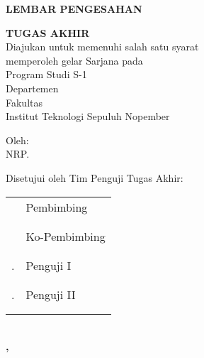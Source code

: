 \begin{center}
  \large
  \textbf{LEMBAR PENGESAHAN}
\end{center}

\thispagestyle{empty}

\begin{center}
  \textbf{\tatitle{}}
\end{center}

\begingroup
\small

\begin{center}
  \textbf{TUGAS AKHIR}
  \\Diajukan untuk memenuhi salah satu syarat \\
  memperoleh gelar Sarjana pada \\
  Program Studi S-1 \studyprogram{} \\
  Departemen \department{} \\
  Fakultas \faculty{} \\
  Institut Teknologi Sepuluh Nopember
\end{center}

\begin{center}
  Oleh: \textbf{\name{}}
  \\NRP. \nrp{}
\end{center}

\begin{center}
  Disetujui oleh Tim Penguji Tugas Akhir:
\end{center}

\begingroup
\setlength{\tabcolsep}{0pt}

\noindent
\begin{tabularx}{\textwidth}{X l}
  \advisor{}               & Pembimbing                        \\
                           &                                     \\
                           &                                     \\
  \coadvisor{}             & Ko-Pembimbing                     \\
                           &                                     \\
                           &                                     \\
  \examinerone{}.          & Penguji I                         \\
                           &                                     \\
                           &                                     \\
  \examinertwo{}.          & Penguji II                        \\
                           &                                     \\
                           &                                     \\

\end{tabularx}
\endgroup

\begin{center}
  \textbf{\MakeUppercase{\place{}}\\\MONTH{}, \the\year{}}
\end{center}
\endgroup
